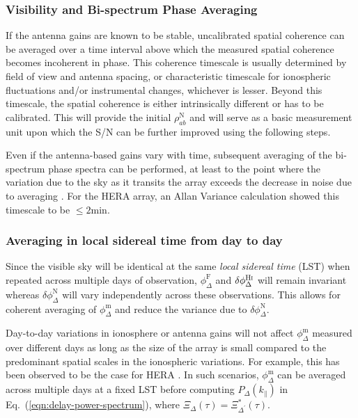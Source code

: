 \documentclass[
reprint,
superscriptaddress,
amsmath,
amssymb,
aps,
prd
]{revtex4-1}
\begin{document}
\subsubsection{Visibility and Bi-spectrum Phase  Averaging}\label{sec:vis-avg}

If the antenna gains are known to be stable, uncalibrated spatial coherence can be averaged over a time interval above which the measured spatial coherence becomes incoherent in phase. This coherence timescale is usually determined by field of view and antenna spacing, or characteristic timescale for ionospheric fluctuations and/or instrumental changes, whichever is lesser. Beyond this timescale, the spatial coherence is either intrinsically different or has to be calibrated. This will provide the initial $\rho_{ab}^\textrm{N}$ and will serve as a basic measurement unit upon which the S/N can be further improved using the following steps. 

Even if the antenna-based gains vary with time, subsequent averaging of the bi-spectrum phase spectra can be performed, at least to the point where the variation due to the sky as it transits the array exceeds the decrease in noise due to averaging \cite{car18}. For the HERA array, an Allan Variance calculation showed this timescale to be $\le 2$min. 

\subsubsection{Averaging in local sidereal time from day to day}\label{sec:lst-avg}

Since the visible sky will be identical at the same {\it local sidereal time} (LST) when repeated across multiple days of observation, $\phi_\Delta^\textrm{F}$ and $\delta\phi_\Delta^\textrm{H{\sc i}}$ will remain invariant whereas $\delta\phi_\Delta^\textrm{N}$ will vary independently across these observations. This allows for coherent averaging of $\phi_\Delta^\textrm{m}$ and reduce the variance due to $\delta\phi_\Delta^\textrm{N}$.

Day-to-day variations in ionosphere or antenna gains will not affect $\phi_\Delta^\textrm{m}$ measured over different days as long as the size of the array is small compared to the predominant spatial scales in the ionospheric variations. For example, this has been observed to be the case for HERA \cite{car18}. In such scenarios, $\phi_\Delta^\textrm{m}$ can be averaged across multiple days at a fixed LST before computing $P_\Delta(k_\parallel)$ in Eq.~(\ref{eqn:delay-power-spectrum}), where $\Xi_\Delta(\tau)=\Xi_{\Delta^\prime}^*(\tau)$. 
\end{document}
